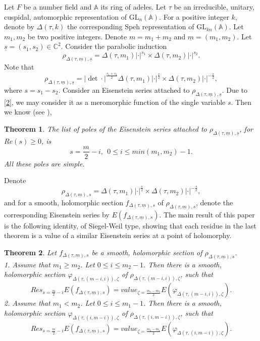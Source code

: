 \documentclass[12pts]{amsart}
\newcommand{\BA}{{\mathbb {A}}}
\newcommand{\BC}{{\mathbb {C}}}
\newcommand{\GL}{{\mathrm{GL}}}
\newtheorem{thm}{Theorem}[section]
\begin{document}
	Let $F$ be a number field and $\BA$ its ring of adeles. Let $\tau$ be an irreducible, unitary, cuspidal, automorphic representation of $\GL_n(\BA)$. For a positive integer $k$, denote by $\Delta(\tau,k)$ the corresponding Speh representation of $\GL_{kn}(\BA)$. Let $m_1, m_2$ be two positive integers. Denote $m=m_1+m_2$ and $\underline{m}=(m_1,m_2)$. Let $\underline{s}=(s_1,s_2)\in \BC^2$. Consider the parabolic induction
    \begin{equation}\label{1}
      \rho_{\Delta(\tau,\underline{m}),\underline{s}}=\Delta(\tau,m_1)|\cdot|^{s_1}\times \Delta(\tau,m_2)|\cdot|^{s_2}.
      \end{equation}
  Note that 
  \begin{equation}\label{2}
  \rho_{\Delta(\tau,\underline{m}),\underline{s}}=|\det\cdot|^{\frac{s_1+s_2}{2}}\Delta(\tau,m_1)|\cdot|^{\frac{s}{2}}\times \Delta(\tau,m_2)|\cdot|^{-\frac{s}{2}},
  \end{equation}
  	where $s=s_1-s_2$. Consider an Eisenstein series attached to $\rho_{\Delta(\tau,\underline{m}),\underline{s}}$. Due to \eqref{2}, we may consider it as a meromorphic function of the single variable $s$. Then we know (see \cite{GS25}),
  \begin{thm}\label{thm A}
  	The list of poles of the Eisenstein series attached to $\rho_{\Delta(\tau,\underline{m}),\underline{s}}$, for $Re(s)\geq 0$, is
  	$$
  	s=\frac{m}{2}-i, \ \ 0\leq i\leq min(m_1,m_2)-1.
  	$$
  	All these poles are simple.
  \end{thm}
Denote
\begin{equation}\label{3}
	\rho_{\Delta(\tau,\underline{m}),s}=\Delta(\tau,m_1)|\cdot|^{\frac{s}{2}}\times \Delta(\tau,m_2)|\cdot|^{-\frac{s}{2}},
\end{equation}
and for a smooth, holomorphic section $f_{\Delta(\tau,\underline{m}),s}$ of $\rho_{\Delta(\tau,\underline{m}),s}$, denote the corresponding Eisenstein series by $E(f_{\Delta(\tau,\underline{m}),s})$.	
The main result of this paper is the following identity, of Siegel-Weil type, showing that each residue in the last theorem is a value of a similar Eisenstein series at a point of holomorphy.
\begin{thm}\label{thm B}
	Let $f_{\Delta(\tau,\underline{m}),s}$ be a smooth, holomorphic section of $\rho_{\Delta(\tau,\underline{m}),s}$.\\
	1. Assume that $m_1\geq m_2$. Let $0\leq i\leq m_2-1$. Then there is a smooth, holomorphic section $\varphi_{\Delta(\tau,(m-i,i)),\zeta}$ of $\rho_{\Delta(\tau,(m-i,i)),\zeta}$, such that
	\begin{equation}\label{4}
		Res_{s=\frac{m}{2}-i}E(f_{\Delta(\tau,\underline{m}),s})=value_{\zeta=\frac{m_1-m_2}{2}}E(\varphi_{\Delta(\tau,(m-i,i)),\zeta}).
	\end{equation}
2. Assume that $m_1<m_2$. Let $0\leq i\leq m_1-1$. Then there is a smooth, holomorphic section $\varphi_{\Delta(\tau,(i,m-i)),\zeta}$ of $\rho_{\Delta(\tau,(i,m-i)),\zeta}$, such that
\begin{equation}\label{5}
	Res_{s=\frac{m}{2}-i}E(f_{\Delta(\tau,\underline{m}),s})=value_{\zeta=\frac{m_2-m_1}{2}}E(\varphi_{\Delta(\tau,(i,m-i)),\zeta}).
\end{equation}
\end{thm}
\end{document}
